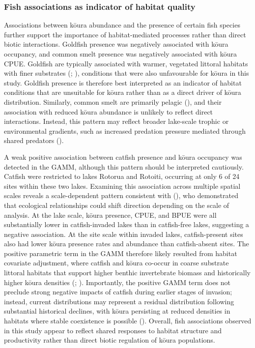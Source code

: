 \documentclass[
  letterpaper,
  DIV=11,
  numbers=noendperiod]{scrartcl}
\begin{document}
\subsubsection{Fish associations as indicator of habitat
quality}\label{fish-associations-as-indicator-of-habitat-quality}

Associations between kōura abundance and the presence of certain fish
species further support the importance of habitat-mediated processes
rather than direct biotic interactions. Goldfish presence was negatively
associated with kōura occupancy, and common smelt presence was
negatively associated with kōura CPUE. Goldfish are typically associated
with warmer, vegetated littoral habitats with finer substrates
(; ), conditions that were also unfavourable for kōura
in this study. Goldfish presence is therefore best interpreted as an
indicator of habitat conditions that are unsuitable for kōura rather
than as a direct driver of kōura distribution. Similarly, common smelt
are primarily pelagic (), and their
association with reduced kōura abundance is unlikely to reflect direct
interactions. Instead, this pattern may reflect broader lake-scale
trophic or environmental gradients, such as increased predation pressure
mediated through shared predators ().

A weak positive association between catfish presence and kōura occupancy
was detected in the GAMM, although this pattern should be interpreted
cautiously. Catfish were restricted to lakes Rotorua and Rotoiti,
occurring at only 6 of 24 sites within these two lakes. Examining this
association across multiple spatial scales reveals a scale-dependent
pattern consistent with (), who
demonstrated that ecological relationships could shift direction
depending on the scale of analysis. At the lake scale, kōura presence,
CPUE, and BPUE were all substantially lower in catfish-invaded lakes
than in catfish-free lakes, suggesting a negative association. At the
site scale within invaded lakes, catfish-present sites also had lower
kōura presence rates and abundance than catfish-absent sites. The
positive parametric term in the GAMM therefore likely resulted from
habitat covariate adjustment, where catfish and kōura co-occur in coarse
substrate littoral habitats that support higher benthic invertebrate
biomass and historically higher kōura densities
(;
). Importantly, the
positive GAMM term does not preclude strong negative impacts of catfish
during earlier stages of invasion; instead, current distributions may
represent a residual distribution following substantial historical
declines, with kōura persisting at reduced densities in habitats where
stable coexistence is possible (). Overall, fish associations observed in this study appear to
reflect shared responses to habitat structure and productivity rather
than direct biotic regulation of kōura populations.
\end{document}

